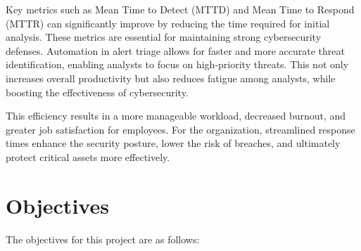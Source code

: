 Key metrics such as Mean Time to Detect (MTTD) and Mean Time to Respond (MTTR) can significantly improve by reducing the time required for initial analysis. These metrics are essential for maintaining strong cybersecurity defenses. Automation in alert triage allows for faster and more accurate threat identification, enabling analysts to focus on high-priority threats. This not only increases overall productivity but also reduces fatigue among analysts, while boosting the effectiveness of cybersecurity.

This efficiency results in a more manageable workload, decreased burnout, and greater job satisfaction for employees. For the organization, streamlined response times enhance the security posture, lower the risk of breaches, and ultimately protect critical assets more effectively.

\section{Objectives}

The objectives for this project are as follows:

